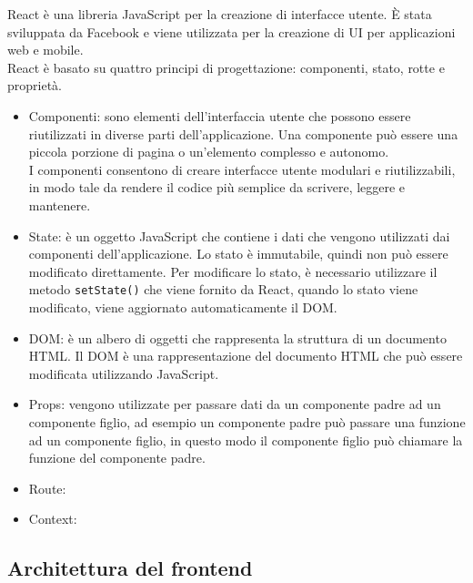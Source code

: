 React è una libreria JavaScript per la creazione di interfacce utente. È stata sviluppata da Facebook e viene utilizzata per la creazione di UI per applicazioni web e mobile.\\
React è basato su quattro principi di progettazione: componenti, stato, rotte e proprietà.\\

\begin{itemize}
    \item{Componenti}: sono elementi dell'interfaccia utente che possono essere riutilizzati in diverse parti dell'applicazione. Una componente può essere una piccola porzione di pagina o un'elemento complesso e autonomo.\\
    I componenti consentono di creare interfacce utente modulari e riutilizzabili, in modo tale da rendere il codice più semplice da scrivere, leggere e mantenere.\\
    \item{State}: è un oggetto JavaScript che contiene i dati che vengono utilizzati dai componenti dell'applicazione. Lo stato è immutabile, quindi non può essere modificato direttamente. Per modificare lo stato, è necessario utilizzare il metodo \texttt{setState()} che viene fornito da React, quando lo stato viene modificato, viene aggiornato automaticamente il DOM.\\
    \item{DOM}: è un albero di oggetti che rappresenta la struttura di un documento HTML. Il DOM è una rappresentazione del documento HTML che può essere modificata utilizzando JavaScript.\\
    \item{Props}: vengono utilizzate per passare dati da un componente padre ad un componente figlio, ad esempio un componente padre può passare una funzione ad un componente figlio, in questo modo il componente figlio può chiamare la funzione del componente padre.\\
    \item{Route}:
    \item{Context}:
\end{itemize}

\subsection{Architettura del frontend}

